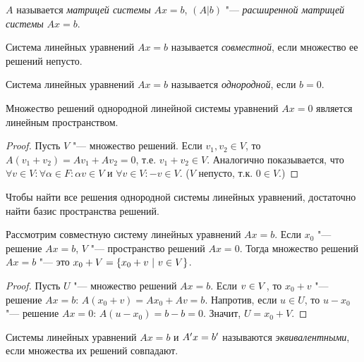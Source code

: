\begin{definition}
	$A$ называется \textit{матрицей системы} $Ax = b$, $(A|b)$ "---\textit{ расширенной матрицей системы} $Ax = b$.
\end{definition}

\begin{definition}
	Система линейных уравнений $Ax = b$ называется \textit{совместной}, если множество ее решений непусто.
\end{definition}

\begin{definition}
	Система линейных уравнений $Ax = b$ называется \textit{однородной}, если $b = 0$.
\end{definition}

\begin{proposition}
	Множество решений однородной линейной системы уравнений $Ax = 0$ является линейным пространством.
\end{proposition}

\begin{proof}
	Пусть $V$ "--- множество решений. Если $v_1, v_2 \in V$, то $A(v_1 + v_2) = Av_1 + Av_2 = 0$, т.\:е. $v_1 + v_2 \in V$. Аналогично показывается, что $\forall v \in V: \forall \alpha \in F: \alpha v \in V$ и $\forall v \in V: -v \in V$. ($V$ непусто, т.\:к. $0 \in V$.)
\end{proof}

\begin{note}
	Чтобы найти все решения однородной системы линейных уравнений, достаточно найти базис пространства решений.
\end{note}

\begin{proposition}
	Рассмотрим совместную систему линейных уравнений $Ax = b$. Если $x_0$ "--- решение $Ax = b$, $V$ "--- пространство решений $Ax = 0$. Тогда множество решений $Ax = b$ "--- это $x_0 + V \hm{=} \{x_0 + v~|~v \in V\}$.
\end{proposition}

\begin{proof}
	Пусть $U$ "--- множество решений $Ax = b$. Если $v \hm{\in} V$, то $x_0 + v$ "--- решение $Ax = b$: $A(x_0 + v) = Ax_0 + Av = b$. Напротив, если $u \in U$, то $u - x_0$ "--- решение $Ax = 0$: $A(u - x_0) = b - b = 0$. Значит, $U = x_0 + V$.
\end{proof}

\begin{definition}
	Системы линейных уравнений $Ax = b$ и $A'x\hm{=}b'$ называются \textit{эквивалентными}, если множества их решений совпадают.
\end{definition}

